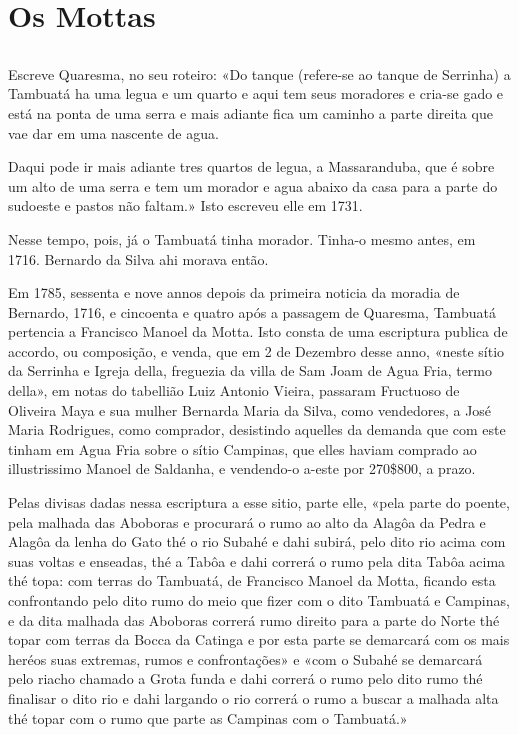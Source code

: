 \chapter{Os Mottas}
\section*{}
Escreve Quaresma, no seu roteiro: «Do tanque (refere-se ao tanque de Serrinha) a Tambuatá ha uma legua e um quarto e aqui
tem seus moradores e cria-se gado e está na ponta de uma serra e mais adiante fica um caminho a parte direita que vae dar em uma nascente de agua.

Daqui pode ir mais adiante tres quartos de legua, a Massaranduba, que é sobre um alto de uma serra e tem um morador e agua abaixo da casa para a parte do sudoeste e pastos não faltam.» Isto escreveu elle em 1731.

Nesse tempo, pois, já o Tambuatá tinha morador. Tinha-o mesmo antes, em 1716. Bernardo da Silva ahi morava então.

Em 1785, sessenta e nove annos depois da primeira noticia da moradia de Bernardo, 1716, e cincoenta e quatro após a passagem de Quaresma, Tambuatá pertencia a Francisco Manoel da Motta. Isto consta de uma escriptura publica de accordo, ou composição, e venda, que em 2 de Dezembro desse anno, «neste sítio da Serrinha e Igreja della, freguezia da villa de Sam Joam de Agua Fria, termo della», em notas do tabellião Luiz Antonio Vieira, passaram Fructuoso de Oliveira Maya e sua mulher Bernarda Maria da Silva, como vendedores, a José Maria Rodrigues, como comprador, desistindo aquelles da demanda que com este tinham em Agua Fria sobre o sítio Campinas, que elles haviam comprado ao illustrissimo Manoel de Saldanha, e vendendo-o a-este por 270\$800, a prazo.

Pelas divisas dadas nessa escriptura a esse sitio, parte elle, «pela parte do poente, pela malhada das Aboboras e procurará o rumo ao alto da Alagôa da Pedra e Alagôa da lenha do Gato thé o rio Subahé e dahi subirá, pelo dito rio acima com suas voltas e enseadas, thé a Tabôa e dahi correrá o rumo pela dita Tabôa acima thé topa: com terras do Tambuatá, de Francisco Manoel da Motta, ficando esta confrontando pelo dito rumo do meio que fizer com o dito Tambuatá e Campinas, e da dita malhada das Aboboras correrá rumo direito para a parte do Norte thé topar com terras da Bocca da Catinga e por esta parte se demarcará com os mais heréos suas extremas, rumos e confrontações» e «com o Subahé se demarcará pelo riacho chamado a Grota funda e dahi correrá o rumo pelo dito rumo thé finalisar o dito rio e dahi largando o rio correrá o rumo a buscar a malhada alta thé topar com o rumo que parte as Campinas com o Tambuatá.»

